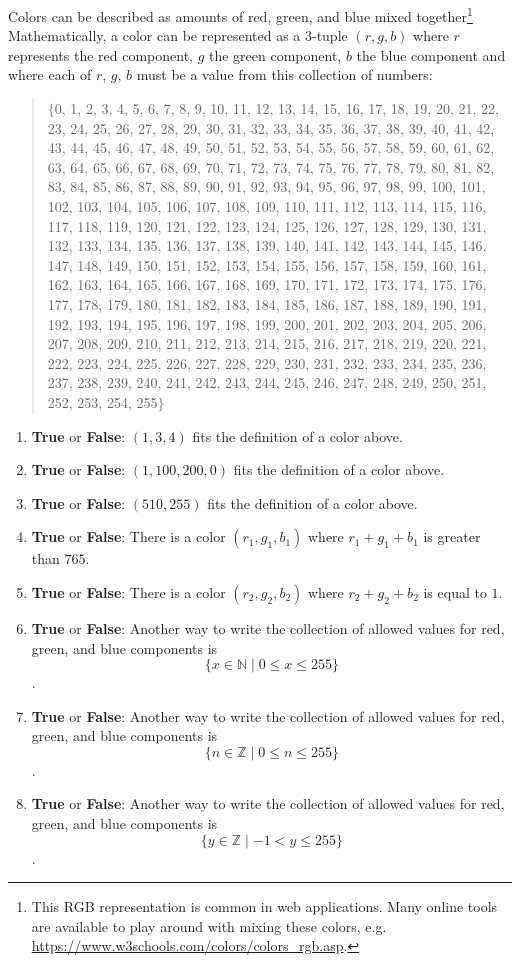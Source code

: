 \documentclass[12pt, oneside]{article}
\begin{document}
Colors can be described as amounts of red, green, and blue mixed together\footnote{This RGB representation
is common in web applications.  Many online tools are available to play around with mixing these colors, 
e.g. \url{https://www.w3schools.com/colors/colors_rgb.asp}. }
Mathematically, a color can be represented as a $3$-tuple $(r, g, b)$ where $r$
represents the red component, $g$ the green component, $b$ the blue component and where each of $r$, $g$, $b$ must
be a value from this collection of numbers:
\begin{quote}
$\{$0, 1, 2, 3, 4, 5, 6, 7, 8, 9, 10, 11, 12, 13, 14, 15, 16, 17, 18, 19, 20, 21, 22, 23, 24, 25, 26, 27, 28, 29, 30, 31, 32, 33, 34, 35, 36, 37, 38, 39, 40, 41, 42, 43, 44, 45, 46, 47, 48, 49, 50, 51, 52, 53, 54, 55, 56, 57, 58, 59, 60, 61, 62, 63, 64, 65, 66, 67, 68, 69, 70, 71, 72, 73, 74, 75, 76, 77, 78, 79, 80, 81, 82, 83, 84, 85, 86, 87, 88, 89, 90, 91, 92, 93, 94, 95, 96, 97, 98, 99, 100, 101, 102, 103, 104, 105, 106, 107, 108, 109, 110, 111, 112, 113, 114, 115, 116, 117, 118, 119, 120, 121, 122, 123, 124, 125, 126, 127, 128, 129, 130, 131, 132, 133, 134, 135, 136, 137, 138, 139, 140, 141, 142, 143, 144, 145, 146, 147, 148, 149, 150, 151, 152, 153, 154, 155, 156, 157, 158, 159, 160, 161, 162, 163, 164, 165, 166, 167, 168, 169, 170, 171, 172, 173, 174, 175, 176, 177, 178, 179, 180, 181, 182, 183, 184, 185, 186, 187, 188, 189, 190, 191, 192, 193, 194, 195, 196, 197, 198, 199, 200, 201, 202, 203, 204, 205, 206, 207, 208, 209, 210, 211, 212, 213, 214, 215, 216, 217, 218, 219, 220, 221, 222, 223, 224, 225, 226, 227, 228, 229, 230, 231, 232, 233, 234, 235, 236, 237, 238, 239, 240, 241, 242, 243, 244, 245, 246, 247, 248, 249, 250, 251, 252, 253, 254, 255$\}$
\end{quote}
\begin{enumerate}
\item \textbf{True} or \textbf{False}: $(1, 3, 4)$ fits the definition of a color above.
\item \textbf{True} or \textbf{False}: $(1, 100, 200, 0)$ fits the definition of a color above.
\item \textbf{True} or \textbf{False}: $(510, 255)$ fits the definition of a color above.
\item \textbf{True} or \textbf{False}: There is a color $(r_1, g_1, b_1)$ where $r_1 + g_1 + b_1$ is greater than $765$.
\item \textbf{True} or \textbf{False}: There is a color $(r_2, g_2, b_2)$ where $r_2 + g_2 + b_2$ is equal to $1$.
\item \textbf{True} or \textbf{False}: Another way to write the collection of allowed values for red, green, and blue components is $$\{x \in \mathbb{N}\mid 0 \leq x \leq 255 \}$$.
\item \textbf{True} or \textbf{False}: Another way to write the collection of allowed values for red, green, and blue components is $$\{n \in \mathbb{Z}\mid 0 \leq n \leq 255 \}$$.
\item \textbf{True} or \textbf{False}: Another way to write the collection of allowed values for red, green, and blue components is $$\{y \in \mathbb{Z}\mid -1 < y \leq 255 \}$$.
\end{enumerate}
\end{document}
